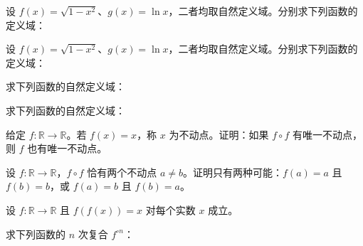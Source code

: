 \noindent\begin{minipage}{\textwidth}
设 $f(x)=\sqrt{1-x^2}$、$g(x)=\ln x$，二者均取自然定义域。分别求下列函数的定义域：
\end{minipage}\par\vfill
\newpage
\noindent\begin{minipage}{\textwidth}
设 $f(x)=\sqrt{1-x^2}$、$g(x)=\ln x$，二者均取自然定义域。分别求下列函数的定义域：
\end{minipage}\par\vfill
\noindent\begin{minipage}{\textwidth}
求下列函数的自然定义域：
\end{minipage}\par\vfill
\noindent\begin{minipage}{\textwidth}
求下列函数的自然定义域：
\end{minipage}\par\vfill
\newpage
\noindent\begin{minipage}{\textwidth}
给定 $f:\mathbb R\to\mathbb R$。若 $f(x)=x$，称 $x$ 为不动点。证明：如果 $f\circ f$ 有唯一不动点，则 $f$ 也有唯一不动点。
\end{minipage}\par\vfill
\noindent\begin{minipage}{\textwidth}
设 $f:\mathbb R\to\mathbb R$，$f\circ f$ 恰有两个不动点 $a\ne b$。证明只有两种可能：$f(a)=a$ 且 $f(b)=b$，或 $f(a)=b$ 且 $f(b)=a$。
\end{minipage}\par\vfill
\noindent\begin{minipage}{\textwidth}
设 $f:\mathbb R\to\mathbb R$ 且 $f(f(x))=x$ 对每个实数 $x$ 成立。
\end{minipage}\par\vfill
\newpage
\noindent\begin{minipage}{\textwidth}
求下列函数的 $n$ 次复合 $f^{\circ n}$：
\end{minipage}\par\vfill

